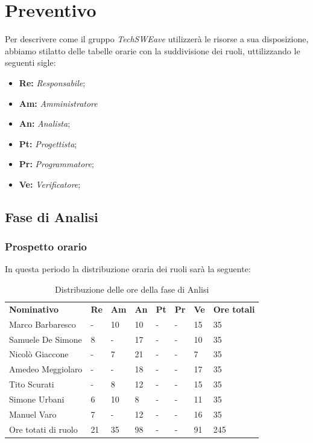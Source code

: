 \section{Preventivo}
Per descrivere come il gruppo \emph{TechSWEave} utilizzerà le risorse a sua disposizione, abbiamo stilatto delle tabelle orarie con la suddivisione dei ruoli, uttilizzando le seguenti sigle:
\begin{itemize}
    \item \textbf{Re: }\emph{Responsabile};
    \item \textbf{Am: }\emph{Amministratore}
    \item \textbf{An: }\emph{Analista};
    \item \textbf{Pt: }\emph{Progettista};
    \item \textbf{Pr: }\emph{Programmatore};
    \item \textbf{Ve: }\emph{Verificatore};
\end{itemize}

\subsection{Fase di Analisi}
    \subsubsection{Prospetto orario}
    In questa periodo la distribuzione oraria dei ruoli sarà la seguente:
        \begin{center}
            \begin{table}[ht!]
                \centering
                \caption{Distribuzione delle ore della fase di Anlisi}
                \vspace{5px}
                \renewcommand{\arraystretch}{1.8}
                \begin{tabular}{p{100px} p{20px} p{20px} p{20px} p{20px} p{20px} p{20px} p{50px} }
                    \rowcolor{logo!70} \textbf{Nominativo} & \textbf{Re} & \textbf{Am} & \textbf{An} & \textbf{Pt} & \textbf{Pr} & \textbf{Ve} & \textbf{Ore totali}\\
                    Marco Barbaresco & - & 10 & 10 & - & - & 15 & 35\\
                    Samuele De Simone & 8 & - & 17 & - & - & 10 & 35\\
                    Nicolò Giaccone & - & 7 & 21 & - & - & 7 & 35\\
                    Amedeo Meggiolaro & - & - & 18 & - & - & 17 & 35\\
                    Tito Scurati & - & 8 & 12 & - & - & 15 & 35\\
                    Simone Urbani & 6 & 10 & 8 & - & - & 11 & 35\\
                    Manuel Varo & 7 & - & 12 & - & - & 16 & 35\\
                    Ore totati di ruolo & 21 & 35 & 98 & - & - & 91 & 245\\
                \end{tabular}
            \end{table}
        \end{center}

